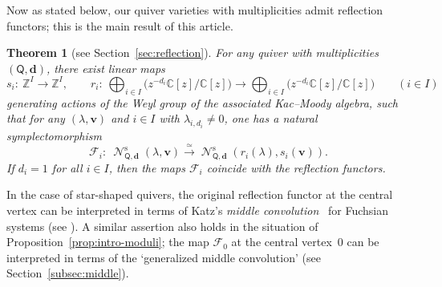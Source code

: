 \documentclass[pdftex]{sigma}
\numberwithin{equation}{section}
\newtheorem{Theorem}{Theorem}[section]
\theoremstyle{definition}
\newcommand{\secref}[1]{Section~\ref{#1}}
\newcommand{\propref}[1]{Proposition~\ref{#1}}
\newcommand{\Z}{\mathbb{Z}} %
\newcommand{\C}{\mathbb{C}} %
\newcommand{\bv}{\mathbf{v}}
\newcommand{\ved}{\mathbf{d}}
\newcommand{\Qst}{\operatorname{\mathscr{N}}^\mathrm{s}}
\newcommand{\QQ}{\mathsf{Q}} %
\newcommand{\frF}{\mathscr{F}} %
\begin{document}
Now as stated below, our
quiver varieties with multiplicities admit ref\/lection functors;
this is the main result of this article.
\begin{Theorem}[see \secref{sec:reflection}]\label{thm:intro-ref}
For any quiver with multiplicities $(\QQ,\ved)$,
there exist linear maps
\[
s_i \colon \ \Z^I \to \Z^I, \qquad
r_i \colon \ \bigoplus_{i \in I}\bigl( z^{-d_i}\C[z]/\C[z] \bigr) \to
\bigoplus_{i \in I}\bigl( z^{-d_i}\C[z]/\C[z] \bigr)
\qquad (i \in I)
\]
generating actions of the Weyl group of the associated Kac--Moody algebra,
such that for any $(\lambda,\bv)$ and $i \in I$ with $\lambda_{i,d_i} \neq 0$,
one has a natural symplectomorphism
\[
\frF_i \colon \ \Qst_{\QQ,\ved}(\lambda,\bv) \xrightarrow{\simeq}
\Qst_{\QQ,\ved}(r_i(\lambda),s_i(\bv)).
\]
If $d_i=1$ for all $i \in I$, then
the maps $\frF_i$ coincide with the reflection functors.
\end{Theorem}

In the case of star-shaped quivers,
the original ref\/lection functor at the central vertex
can be interpreted in terms of
Katz's {\em middle convolution}~\cite{MR1366651}
for Fuchsian systems (see \cite[Appendix~A]{MR2107041}).
A similar assertion also holds
in the situation of \propref{prop:intro-moduli};
the map $\frF_0$ at the central vertex~$0$
can be interpreted in terms of
the `generalized middle convolution' \cite{0808.0699,0911.3863}
(see \secref{subsec:middle}).
\end{document}
